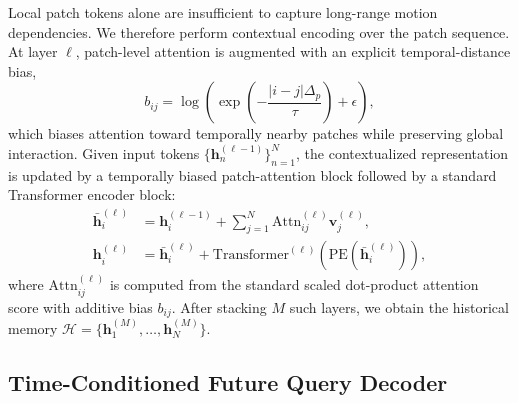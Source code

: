 Local patch tokens alone are insufficient to capture long-range motion dependencies. We therefore perform contextual encoding over the patch sequence. At layer $\ell$, patch-level attention is augmented with an explicit temporal-distance bias,
\begin{equation}
b_{ij} = \log \left(\exp\left(-\frac{|i-j|\Delta_p}{\tau}\right)+\epsilon\right),
\end{equation}
which biases attention toward temporally nearby patches while preserving global interaction. Given input tokens $\{\bm{h}_n^{(\ell-1)}\}_{n=1}^{N}$, the contextualized representation is updated by a temporally biased patch-attention block followed by a standard Transformer encoder block:
\begin{align}
\bar{\bm{h}}_i^{(\ell)} &= \bm{h}_i^{(\ell-1)} + \sum_{j=1}^{N}\mathrm{Attn}_{ij}^{(\ell)}\bm{v}_j^{(\ell)}, \\
\bm{h}_i^{(\ell)} &= \bar{\bm{h}}_i^{(\ell)} + \mathrm{Transformer}^{(\ell)}\!\left(\mathrm{PE}(\bar{\bm{h}}_i^{(\ell)})\right),
\end{align}
where $\mathrm{Attn}_{ij}^{(\ell)}$ is computed from the standard scaled dot-product attention score with additive bias $b_{ij}$. After stacking $M$ such layers, we obtain the historical memory $\mathcal{H}=\{\bm{h}_1^{(M)},\dots,\bm{h}_N^{(M)}\}$.

\subsection{Time-Conditioned Future Query Decoder}
\label{subsec:decoder}

